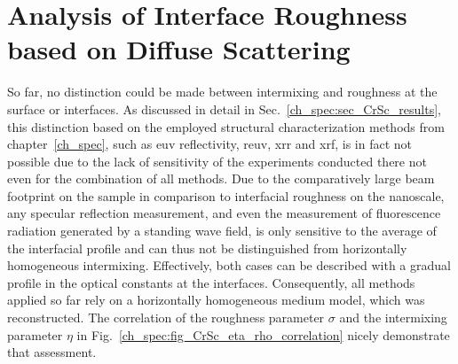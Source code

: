 \chapter{Analysis of Interface Roughness based on Diffuse Scattering} \label{ch_diff}

So far, no distinction could be made between intermixing and roughness at the surface or interfaces. As discussed in detail in Sec.~\ref{ch_spec:sec_CrSc_results}, this distinction based on the employed structural characterization methods from chapter~\ref{ch_spec}, such as \gls{euv} reflectivity, \gls{reuv}, \gls{xrr} and \gls{xrf}, is in fact not possible due to the lack of sensitivity of the experiments conducted there not even for the combination of all methods. Due to the comparatively large beam footprint on the sample in comparison to interfacial roughness on the nanoscale, any specular reflection measurement, and even the measurement of fluorescence radiation generated by a standing wave field, is only sensitive to the average of the interfacial profile and can thus not be distinguished from horizontally homogeneous intermixing. Effectively, both cases can be described with a gradual profile in the optical constants at the interfaces. Consequently, all methods applied so far rely on a horizontally homogeneous medium model, which was reconstructed. The correlation of the roughness parameter $\sigma$ and the intermixing parameter $\eta$ in Fig.~\ref{ch_spec:fig_CrSc_eta_rho_correlation} nicely demonstrate that assessment.

